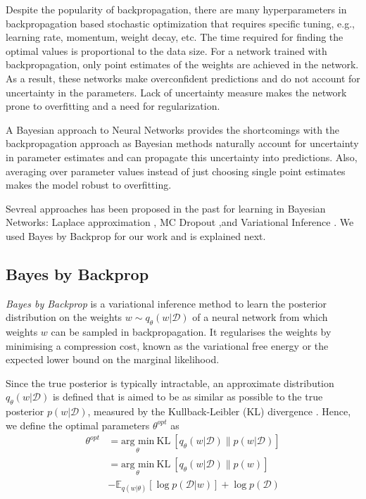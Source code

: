 Despite the popularity of backpropagation, there are many hyperparameters in backpropagation based stochastic optimization that requires specific tuning, e.g., learning rate, momentum, weight decay, etc. The time required for finding the optimal values is proportional to the data size. For a network trained with backpropagation, only point estimates of the weights are achieved in the network. As a result, these networks make overconfident predictions and do not account for uncertainty in the parameters. Lack of uncertainty measure makes the network prone to overfitting and a need for regularization.

A Bayesian approach to Neural Networks provides the shortcomings with the backpropagation approach \cite{mackay1996hyperparameters} as Bayesian methods naturally account for uncertainty in parameter estimates and can propagate this uncertainty into predictions.
Also, averaging over parameter values instead of just choosing single point estimates makes the model robust to overfitting. 

Sevreal approaches has been proposed in the past for learning in Bayesian Networks: Laplace approximation \cite{Mackay1991APB}, MC Dropout \cite{gal2015bayesian},and Variational Inference \cite{hinton1993keeping} \cite{graves2011practical} \cite{blundell2015weight}. We used Bayes by Backprop \cite{blundell2015weight} for our work and is explained next.

\subsection{Bayes by Backprop}
\textit{Bayes by Backprop} \cite{graves2011practical, blundell2015weight} is a variational inference method to learn the posterior distribution on the weights $w \sim q_{\theta}(w|\mathcal{D})$ of a neural network from which weights $w$ can be sampled in backpropagation. 
It regularises the weights by minimising a compression cost, known as the variational free energy or the expected lower bound on the marginal likelihood.

Since the true posterior is typically intractable, an approximate distribution $q_{\theta}(w|\mathcal{D})$ is defined that is aimed to be as similar as possible to the true posterior $p(w|\mathcal{D})$, measured by the Kullback-Leibler (KL) divergence \cite{kullback1951information}. Hence, we define the optimal parameters $\theta^{opt}$ as
\begin{equation}
    \begin{aligned} \label{KL}
        \theta^{opt}&=\underset{\theta}{\text{arg min}}\ \text{KL} \ [q_{\theta}(w|\mathcal{D})\|p(w|\mathcal{D})] \\
        &=\underset{\theta}{\text{arg min}}\ \text{KL} \ [q_{\theta}(w|\mathcal{D})\|p(w)] \\ & -\mathbb{E}_{q(w|\theta)}[\log p(\mathcal{D}|w)]+\log p(\mathcal{D})
    \end{aligned}
\end{equation}

